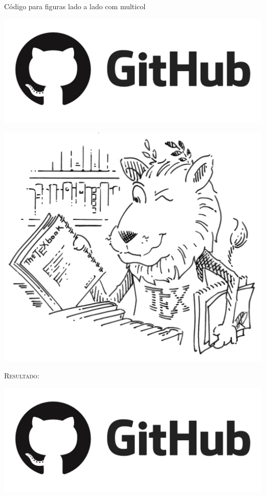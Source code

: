 \documentclass[a4paper,12pt,oneside,openright,extrafontsizes,openbib]{memoir}
\begin{document}
{\begin{codex}{Código para figuras lado a lado com multicol}
\begin{multicols}{2}
\includegraphics[scale=.15]{./img/github.png}

\includegraphics[scale=.040]{./img/tex-lion.png}
\end{multicols}
\end{codex}

\textsc{Resultado:}
\begin{multicols}{2}
	\includegraphics[scale=.15]{./img/github.png}
	

\end{multicols}}
\end{document}
